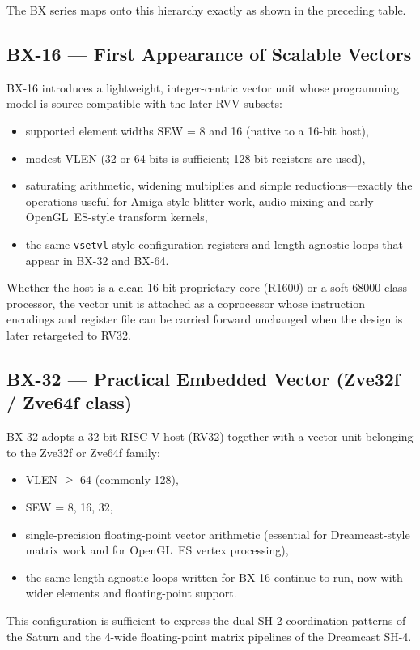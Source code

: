 \documentclass[11pt,a4paper]{article}
\begin{document}
The BX series maps onto this hierarchy exactly as shown in the preceding table.

\subsection{BX-16 --- First Appearance of Scalable Vectors}

BX-16 introduces a lightweight, integer-centric vector unit whose programming model is source-compatible with the later RVV subsets:
\begin{itemize}[leftmargin=1.5em]
  \item supported element widths SEW = 8 and 16 (native to a 16-bit host),
  \item modest VLEN (32 or 64 bits is sufficient; 128-bit registers are used),
  \item saturating arithmetic, widening multiplies and simple reductions---exactly the operations useful for Amiga-style blitter work, audio mixing and early OpenGL~ES-style transform kernels,
  \item the same \texttt{vsetvl}-style configuration registers and length-agnostic loops that appear in BX-32 and BX-64.
\end{itemize}
Whether the host is a clean 16-bit proprietary core (R1600) or a soft 68000-class processor, the vector unit is attached as a coprocessor whose instruction encodings and register file can be carried forward unchanged when the design is later retargeted to RV32.

\subsection{BX-32 --- Practical Embedded Vector (Zve32f / Zve64f class)}

BX-32 adopts a 32-bit RISC-V host (RV32) together with a vector unit belonging to the Zve32f or Zve64f family:
\begin{itemize}[leftmargin=1.5em]
  \item VLEN $\ge$ 64 (commonly 128),
  \item SEW = 8, 16, 32,
  \item single-precision floating-point vector arithmetic (essential for Dreamcast-style matrix work and for OpenGL~ES vertex processing),
  \item the same length-agnostic loops written for BX-16 continue to run, now with wider elements and floating-point support.
\end{itemize}
This configuration is sufficient to express the dual-SH-2 coordination patterns of the Saturn and the 4-wide floating-point matrix pipelines of the Dreamcast SH-4.
\end{document}
